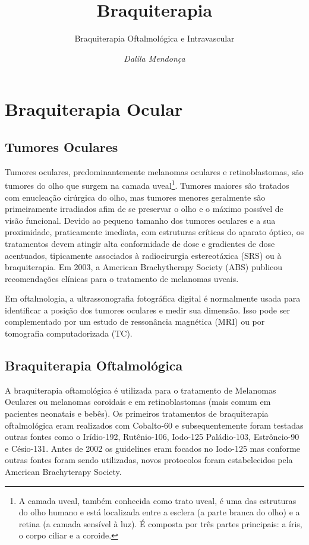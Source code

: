 \documentclass[11pt,a4paper]{article}
\title{\LobsterTwo\Huge{Braquiterapia}}
\author{\LobsterTwo\Large{Braquiterapia Oftalmológica e Intravascular\nocite{*}}}
\date{\LobsterTwo\textit{Dalila Mendonça}}
\begin{document}
	\maketitle

\section{Braquiterapia Ocular}

\subsection*{Tumores Oculares}

    Tumores oculares, predominantemente melanomas oculares e retinoblastomas, são tumores do olho que surgem na camada uveal\footnote{A camada uveal, também conhecida como trato uveal, é uma das estruturas do olho humano e está localizada entre a esclera (a parte branca do olho) e a retina (a camada sensível à luz). É composta por três partes principais: a íris, o corpo ciliar e a coroide.}. Tumores maiores são tratados com enucleação cirúrgica do olho, mas tumores menores geralmente são primeiramente irradiados afim de se preservar o olho e o máximo possível de visão funcional. Devido ao pequeno tamanho dos tumores oculares e a sua proximidade, praticamente imediata, com estruturas críticas do aparato óptico, os tratamentos devem atingir alta conformidade de dose e gradientes de dose acentuados, tipicamente associados à radiocirurgia estereotáxica (SRS) ou à braquiterapia. Em 2003, a American Brachytherapy Society (ABS) publicou recomendações clínicas para o tratamento de melanomas uveais.
    
    Em oftalmologia, a ultrassonografia fotográfica digital é normalmente usada para identificar a posição dos tumores oculares e medir sua dimensão. Isso pode ser complementado por um estudo de ressonância magnética (MRI) ou por tomografia computadorizada (TC).

\subsection*{Braquiterapia Oftalmológica}


    A braquiterapia oftamológica é utilizada para o tratamento de Melanomas Oculares ou melanomas coroidais e em retinoblastomas (mais comum em pacientes neonatais e bebês). Os primeiros tratamentos de braquiterapia oftalmológica eram realizados com Cobalto-60 e subsequentemente foram testadas outras fontes como o Irídio-192, Rutênio-106, Iodo-125  Paládio-103, Estrôncio-90 e Césio-131.  Antes de 2002 os guidelines eram focados no Iodo-125 mas conforme outras fontes foram sendo utilizadas, novos protocolos foram estabelecidos pela American Brachyterapy Society. 
    
\end{document}
